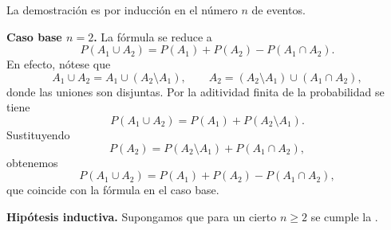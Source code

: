 \documentclass[../Main.tex]{subfiles}
\begin{document}
\begin{demostracion}{}{}
La demostración es por inducción en el número \(n\) de eventos.


\noindent\textbf{Caso base \(n=2\).}  
La fórmula se reduce a
\[
   P(A_1\cup A_2)=P(A_1)+P(A_2)-P(A_1\cap A_2).
\]
En efecto, nótese que
\[
A_1\cup A_2 = A_1 \cup (A_2\setminus A_1), \qquad   
A_2 = (A_2\setminus A_1)\cup (A_1\cap A_2),
\]
donde las uniones son disjuntas.  
Por la aditividad finita de la probabilidad se tiene
\[
P(A_1\cup A_2) = P(A_1) + P(A_2\setminus A_1).
\]
Sustituyendo
\[
P(A_2) = P(A_2\setminus A_1) + P(A_1\cap A_2),
\]
obtenemos
\[
P(A_1\cup A_2) = P(A_1) + P(A_2) - P(A_1\cap A_2),
\]
que coincide con la fórmula en el caso base.

\noindent\textbf{Hipótesis inductiva.}
Supongamos que para un cierto \(n\ge 2\) se cumple la .



\end{demostracion}
\end{document}
